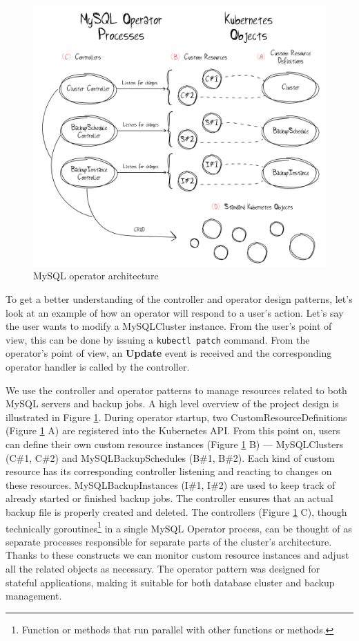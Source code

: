 \begin{figure}[!ht]
    \centering
    \includegraphics[width=1\textwidth, angle=0]{img/Design.pdf}
    \caption{MySQL operator architecture}
    \label{fig:design}
\end{figure}

To get a better understanding of the controller and operator design patterns, let’s look at an
example of how an operator will respond to a user’s action. Let’s say the user wants to modify a
MySQLCluster instance. From the user’s point of view, this can be done by issuing a
\texttt{kubectl patch} command. From the operator’s point of view, an \textbf{Update} event is
received and the corresponding operator handler is called by the controller.

We use the controller and operator patterns to manage resources related to both
MySQL servers and backup jobs. A high level overview of the project design is
illustrated in Figure \ref{fig:design}. During operator startup, two
CustomResourceDefinitions (Figure \ref{fig:design} A) are registered into the Kubernetes API.
From this point on, users can define their own custom resource instances (Figure \ref{fig:design} B) ---
MySQLClusters (C\#1, C\#2) and MySQLBackupSchedules (B\#1, B\#2). Each kind of
custom resource has its corresponding controller listening and reacting to changes on these
resources. MySQLBackupInstances (I\#1, I\#2) are used to keep track of already started or finished backup jobs.
The controller ensures that an actual backup file is properly created and deleted.
The controllers (Figure \ref{fig:design} C), though technically
goroutines\footnote{Function or methods that run parallel with other functions or methods.} in a single
MySQL Operator process, can be thought of as separate processes responsible for separate parts of the
cluster’s architecture. Thanks to these constructs we can monitor custom resource instances and adjust
all the related objects as necessary. The operator pattern was designed for stateful applications, making
it suitable for both database cluster and backup management.~\cite{coreos}

